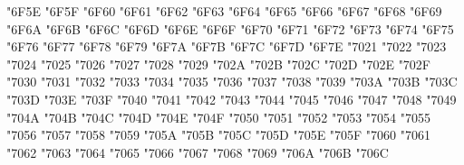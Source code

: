 {\Uchar\jis"6F5E %
\Uchar\jis"6F5F %
\Uchar\jis"6F60 %
\Uchar\jis"6F61 %
\Uchar\jis"6F62 %
\Uchar\jis"6F63 %
\Uchar\jis"6F64 %
\Uchar\jis"6F65 %
\Uchar\jis"6F66 %
\Uchar\jis"6F67 %
\Uchar\jis"6F68 %
\Uchar\jis"6F69 %
\Uchar\jis"6F6A %
\Uchar\jis"6F6B %
\Uchar\jis"6F6C %
\Uchar\jis"6F6D %
\Uchar\jis"6F6E %
\Uchar\jis"6F6F %
\Uchar\jis"6F70 %
\Uchar\jis"6F71 %
\Uchar\jis"6F72 %
\Uchar\jis"6F73 %
\Uchar\jis"6F74 %
\Uchar\jis"6F75 %
\Uchar\jis"6F76 %
\Uchar\jis"6F77 %
\Uchar\jis"6F78 %
\Uchar\jis"6F79 %
\Uchar\jis"6F7A %
\Uchar\jis"6F7B %
\Uchar\jis"6F7C %
\Uchar\jis"6F7D %
\Uchar\jis"6F7E %
\Uchar\jis"7021 %
\Uchar\jis"7022 %
\Uchar\jis"7023 %
\Uchar\jis"7024 %
\Uchar\jis"7025 %
\Uchar\jis"7026 %
\Uchar\jis"7027 %
\Uchar\jis"7028 %
\Uchar\jis"7029 %
\Uchar\jis"702A %
\Uchar\jis"702B %
\Uchar\jis"702C %
\Uchar\jis"702D %
\Uchar\jis"702E %
\Uchar\jis"702F %
\Uchar\jis"7030 %
\Uchar\jis"7031 %
\Uchar\jis"7032 %
\Uchar\jis"7033 %
\Uchar\jis"7034 %
\Uchar\jis"7035 %
\Uchar\jis"7036 %
\Uchar\jis"7037 %
\Uchar\jis"7038 %
\Uchar\jis"7039 %
\Uchar\jis"703A %
\Uchar\jis"703B %
\Uchar\jis"703C %
\Uchar\jis"703D %
\Uchar\jis"703E %
\Uchar\jis"703F %
\Uchar\jis"7040 %
\Uchar\jis"7041 %
\Uchar\jis"7042 %
\Uchar\jis"7043 %
\Uchar\jis"7044 %
\Uchar\jis"7045 %
\Uchar\jis"7046 %
\Uchar\jis"7047 %
\Uchar\jis"7048 %
\Uchar\jis"7049 %
\Uchar\jis"704A %
\Uchar\jis"704B %
\Uchar\jis"704C %
\Uchar\jis"704D %
\Uchar\jis"704E %
\Uchar\jis"704F %
\Uchar\jis"7050 %
\Uchar\jis"7051 %
\Uchar\jis"7052 %
\Uchar\jis"7053 %
\Uchar\jis"7054 %
\Uchar\jis"7055 %
\Uchar\jis"7056 %
\Uchar\jis"7057 %
\Uchar\jis"7058 %
\Uchar\jis"7059 %
\Uchar\jis"705A %
\Uchar\jis"705B %
\Uchar\jis"705C %
\Uchar\jis"705D %
\Uchar\jis"705E %
\Uchar\jis"705F %
\Uchar\jis"7060 %
\Uchar\jis"7061 %
\Uchar\jis"7062 %
\Uchar\jis"7063 %
\Uchar\jis"7064 %
\Uchar\jis"7065 %
\Uchar\jis"7066 %
\Uchar\jis"7067 %
\Uchar\jis"7068 %
\Uchar\jis"7069 %
\Uchar\jis"706A %
\Uchar\jis"706B %
\Uchar\jis"706C %
}
